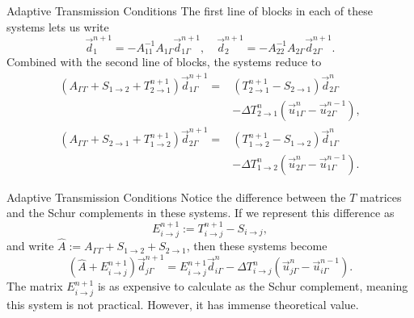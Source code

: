 \documentclass{beamer}
\begin{document}
\begin{frame}{Adaptive Transmission Conditions}
The first line of blocks in each of these systems lets us write
\begin{equation*}
	\vec{d}_1^{n+1} = -A_{11}^{-1} A_{1 \Gamma} \vec{d}_{1 \Gamma}^{n+1}, \quad
	\vec{d}_2^{n+1} = -A_{22}^{-1} A_{2 \Gamma} \vec{d}_{2 \Gamma}^{n+1}.
\end{equation*}
Combined with the second line of blocks, the systems reduce to
\begin{align*}
	\left ( A_{\Gamma \Gamma} + S_{1 \to 2} + T_{2 \to 1}^{n+1} \right ) \vec{d}_{1 \Gamma}^{n+1}
	= & \left ( T_{2 \to 1}^{n+1} - S_{2 \to 1} \right ) \vec{d}_{2 \Gamma}^n \\
	&  - \Delta T_{2 \to 1}^n \left ( \vec{u}_{1 \Gamma}^n - \vec{u}_{2 \Gamma}^{n-1} \right ), \\
	\left ( A_{\Gamma \Gamma} + S_{2 \to 1} + T_{1 \to 2}^{n+1} \right ) \vec{d}_{2 \Gamma}^{n+1}
	= & \left ( T_{1 \to 2}^{n+1} - S_{1 \to 2} \right ) \vec{d}_{1 \Gamma}^n \\
	& - \Delta T_{1 \to 2}^n \left ( \vec{u}_{2 \Gamma}^n - \vec{u}_{1 \Gamma}^{n-1} \right ).
\end{align*}
\end{frame}

\begin{frame}{Adaptive Transmission Conditions}
Notice the difference between the $T$ matrices and the Schur complements in these systems.
If we represent this difference as
\begin{equation*}
	E_{i \to j}^{n+1} := T_{i \to j}^{n+1} - S_{i \to j},
\end{equation*}
and write $\hat{A} := A_{\Gamma \Gamma} + S_{1 \to 2} + S_{2 \to 1}$, then these systems become
\begin{equation*}
	\left ( \hat{A} + E_{i \to j}^{n+1} \right ) \vec{d}_{j \Gamma}^{n+1} = E_{i \to j}^{n+1} \vec{d}_{i \Gamma}^n - \Delta T_{i \to j}^n \left ( \vec{u}_{j \Gamma}^n - \vec{u}_{i \Gamma}^{n-1} \right ).
\end{equation*}
The matrix $E_{i \to j}^{n+1}$ is as expensive to calculate as the Schur complement, meaning this system is not practical.
However, it has immense theoretical value.
\end{frame}
\end{document}
